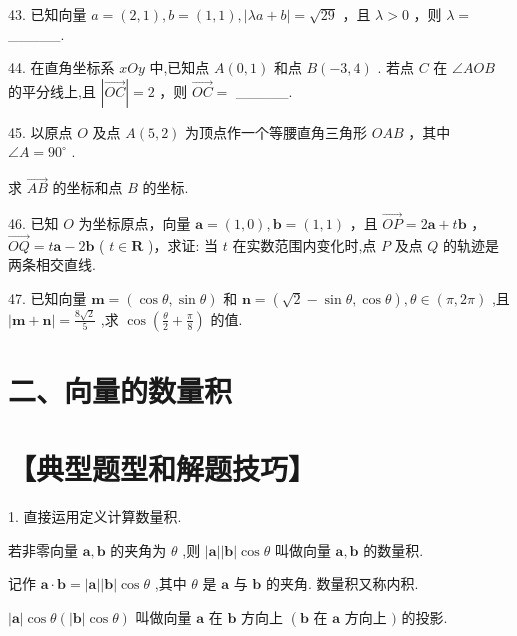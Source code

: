 \documentclass[10pt]{article}
\begin{document}
43. 已知向量 \(a = \left( {2,1}\right) ,b = \left( {1,1}\right) ,\left| {{\lambda a} + b}\right|  = \sqrt{29}\) ，且 \(\lambda  > 0\) ，则 \(\lambda  =\) \_\_\_\_\_.

44. 在直角坐标系 \({xOy}\) 中,已知点 \(A\left( {0,1}\right)\) 和点 \(B\left( {-3,4}\right)\) . 若点 \(C\) 在 \(\angle {AOB}\) 的平分线上,且 \(\left| \overrightarrow{OC}\right|  = 2\) ，则 \(\overrightarrow{OC} =\) \_\_\_\_\_.

45. 以原点 \(O\) 及点 \(A\left( {5,2}\right)\) 为顶点作一个等腰直角三角形 \({OAB}\) ，其中 \(\angle A = {90}^{ \circ  }\) .

求 \(\overrightarrow{AB}\) 的坐标和点 \(B\) 的坐标.

46. 已知 \(O\) 为坐标原点，向量 \(\mathbf{a} = \left( {1,0}\right) ,\mathbf{b} = \left( {1,1}\right)\) ，且 \(\overrightarrow{OP} = 2\mathbf{a} + t\mathbf{b}\) ， \(\overrightarrow{OQ} = t\mathbf{a} - 2\mathbf{b}\) ( \(t \in  \mathbf{R}\) )，求证: 当 \(t\) 在实数范围内变化时,点 \(P\) 及点 \(Q\) 的轨迹是两条相交直线.

47. 已知向量 \(\mathbf{m} = \left( {\cos \theta ,\sin \theta }\right)\) 和 \(\mathbf{n} = \left( {\sqrt{2} - \sin \theta ,\cos \theta }\right) ,\theta  \in  \left( {\pi ,{2\pi }}\right)\) ,且 \(\left| {\mathbf{m} + \mathbf{n}}\right|  = \frac{8\sqrt{2}}{5}\) ,求 \(\cos \left( {\frac{\theta }{2} + \frac{\pi }{8}}\right)\) 的值.

\section*{二、向量的数量积}

\section*{【典型题型和解题技巧】}

1. 直接运用定义计算数量积.

若非零向量 \(\mathbf{a},\mathbf{b}\) 的夹角为 \(\theta\) ,则 \(\left| \mathbf{a}\right| \left| \mathbf{b}\right| \cos \theta\) 叫做向量 \(\mathbf{a},\mathbf{b}\) 的数量积.

记作 \(\mathbf{a} \cdot  \mathbf{b} = \left| \mathbf{a}\right| \left| \mathbf{b}\right| \cos \theta\) ,其中 \(\theta\) 是 \(\mathbf{a}\) 与 \(\mathbf{b}\) 的夹角. 数量积又称内积.

\(\left| \mathbf{a}\right| \cos \theta \left( {\left| \mathbf{b}\right| \cos \theta }\right)\) 叫做向量 \(\mathbf{a}\) 在 \(\mathbf{b}\) 方向上 \(\left( {\mathbf{b}\text{ 在 }\mathbf{a}}\right.\) 方向上 \()\) 的投影.
\end{document}

